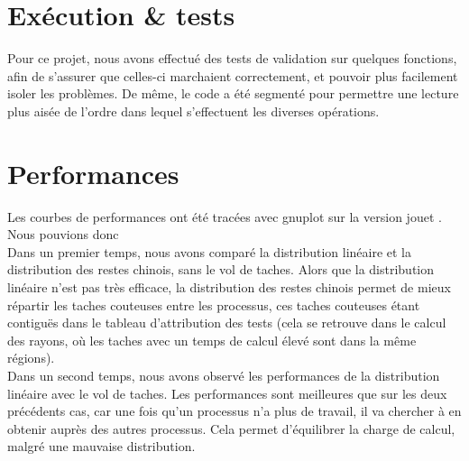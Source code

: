 \section{Exécution \& tests} %
\label{sec:execution}

Pour ce projet, nous avons effectué des tests de validation sur quelques fonctions, afin de s'assurer que celles-ci marchaient correctement, et pouvoir plus facilement isoler les problèmes. 
De même, le code a été segmenté pour permettre une lecture plus aisée de l'ordre dans lequel s'effectuent les diverses opérations.

\section{Performances} %
\label{sec:perf}

Les courbes de performances ont été tracées avec gnuplot sur la version \og jouet \fg. Nous pouvions donc\\

Dans un premier temps, nous avons comparé la distribution linéaire et la distribution des restes chinois, sans le vol de taches. Alors que la distribution linéaire n'est pas très efficace, la distribution des restes chinois permet de mieux répartir les taches couteuses entre les processus, ces taches couteuses étant contiguës dans le tableau d'attribution des tests (cela se retrouve dans le calcul des rayons, où les taches avec un temps de calcul élevé sont dans la même régions).\\

Dans un second temps, nous avons observé les performances de la distribution linéaire avec le vol de taches. Les performances sont meilleures que sur les deux précédents cas, car une fois qu'un processus n'a plus de travail, il va chercher à en obtenir auprès des autres processus. Cela permet d'équilibrer la charge de calcul, malgré une mauvaise distribution.\\



